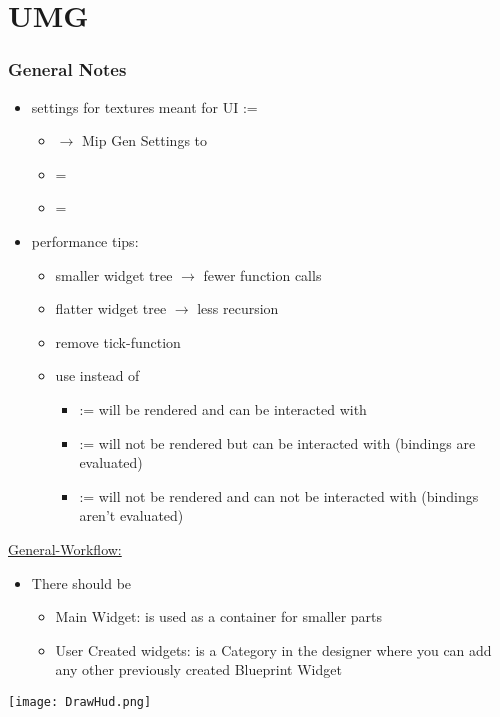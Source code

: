\chapter{UMG}
    \subsection{General Notes}
        \begin{itemize}
            \item  settings for textures meant for UI := 
            \begin{itemize}
                \item {} $\rightarrow$ Mip Gen Settings to 
                \item {} =  
                \item {} = 
            \end{itemize}
            \item performance tips:
            \begin{itemize}
                \item smaller widget tree $\rightarrow$ fewer function calls
                \item flatter widget tree $\rightarrow$ less recursion
                \item remove tick-function
                \item use  instead of 
                \begin{itemize}
                    \item {} := will be rendered and can be interacted with
                    \item {} := will not be rendered but can be interacted with (bindings are evaluated)
                    \item {} := will not be rendered and can not be interacted with (bindings aren't evaluated)
                \end{itemize}
            \end{itemize}
        \end{itemize}

        \uline{General-Workflow:}
        \begin{itemize}
            \item There should be
            \begin{itemize}
                \item Main Widget: is used as a container for smaller parts
                \item User Created widgets: is a Category in the designer where you can add any other previously created Blueprint Widget
            \end{itemize}
        \end{itemize}
        \texttt{[image: DrawHud.png]} \\


